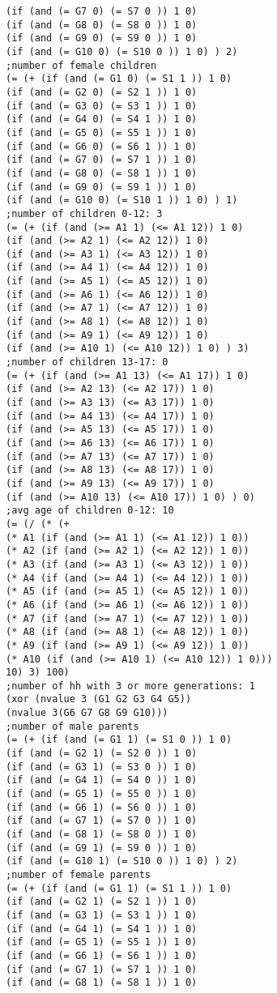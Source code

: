 \documentclass[5p,times,11pt]{elsarticle}
\begin{document}
\begin{verbatim}
(if (and (= G7 0) (= S7 0 )) 1 0)
(if (and (= G8 0) (= S8 0 )) 1 0)
(if (and (= G9 0) (= S9 0 )) 1 0)
(if (and (= G10 0) (= S10 0 )) 1 0) ) 2)
;number of female children
(= (+ (if (and (= G1 0) (= S1 1 )) 1 0)
(if (and (= G2 0) (= S2 1 )) 1 0)
(if (and (= G3 0) (= S3 1 )) 1 0)
(if (and (= G4 0) (= S4 1 )) 1 0)
(if (and (= G5 0) (= S5 1 )) 1 0)
(if (and (= G6 0) (= S6 1 )) 1 0)
(if (and (= G7 0) (= S7 1 )) 1 0)
(if (and (= G8 0) (= S8 1 )) 1 0)
(if (and (= G9 0) (= S9 1 )) 1 0)
(if (and (= G10 0) (= S10 1 )) 1 0) ) 1)
;number of children 0-12: 3
(= (+ (if (and (>= A1 1) (<= A1 12)) 1 0)
(if (and (>= A2 1) (<= A2 12)) 1 0)
(if (and (>= A3 1) (<= A3 12)) 1 0)
(if (and (>= A4 1) (<= A4 12)) 1 0)
(if (and (>= A5 1) (<= A5 12)) 1 0)
(if (and (>= A6 1) (<= A6 12)) 1 0)
(if (and (>= A7 1) (<= A7 12)) 1 0)
(if (and (>= A8 1) (<= A8 12)) 1 0)
(if (and (>= A9 1) (<= A9 12)) 1 0)
(if (and (>= A10 1) (<= A10 12)) 1 0) ) 3)
;number of children 13-17: 0
(= (+ (if (and (>= A1 13) (<= A1 17)) 1 0)
(if (and (>= A2 13) (<= A2 17)) 1 0)
(if (and (>= A3 13) (<= A3 17)) 1 0)
(if (and (>= A4 13) (<= A4 17)) 1 0)
(if (and (>= A5 13) (<= A5 17)) 1 0)
(if (and (>= A6 13) (<= A6 17)) 1 0)
(if (and (>= A7 13) (<= A7 17)) 1 0)
(if (and (>= A8 13) (<= A8 17)) 1 0)
(if (and (>= A9 13) (<= A9 17)) 1 0)
(if (and (>= A10 13) (<= A10 17)) 1 0) ) 0)
;avg age of children 0-12: 10
(= (/ (* (+
(* A1 (if (and (>= A1 1) (<= A1 12)) 1 0))
(* A2 (if (and (>= A2 1) (<= A2 12)) 1 0))
(* A3 (if (and (>= A3 1) (<= A3 12)) 1 0))
(* A4 (if (and (>= A4 1) (<= A4 12)) 1 0))
(* A5 (if (and (>= A5 1) (<= A5 12)) 1 0))
(* A6 (if (and (>= A6 1) (<= A6 12)) 1 0))
(* A7 (if (and (>= A7 1) (<= A7 12)) 1 0))
(* A8 (if (and (>= A8 1) (<= A8 12)) 1 0))
(* A9 (if (and (>= A9 1) (<= A9 12)) 1 0))
(* A10 (if (and (>= A10 1) (<= A10 12)) 1 0)))
10) 3) 100)
;number of hh with 3 or more generations: 1
(xor (nvalue 3 (G1 G2 G3 G4 G5))
(nvalue 3(G6 G7 G8 G9 G10)))
;number of male parents
(= (+ (if (and (= G1 1) (= S1 0 )) 1 0)
(if (and (= G2 1) (= S2 0 )) 1 0)
(if (and (= G3 1) (= S3 0 )) 1 0)
(if (and (= G4 1) (= S4 0 )) 1 0)
(if (and (= G5 1) (= S5 0 )) 1 0)
(if (and (= G6 1) (= S6 0 )) 1 0)
(if (and (= G7 1) (= S7 0 )) 1 0)
(if (and (= G8 1) (= S8 0 )) 1 0)
(if (and (= G9 1) (= S9 0 )) 1 0)
(if (and (= G10 1) (= S10 0 )) 1 0) ) 2)
;number of female parents
(= (+ (if (and (= G1 1) (= S1 1 )) 1 0)
(if (and (= G2 1) (= S2 1 )) 1 0)
(if (and (= G3 1) (= S3 1 )) 1 0)
(if (and (= G4 1) (= S4 1 )) 1 0)
(if (and (= G5 1) (= S5 1 )) 1 0)
(if (and (= G6 1) (= S6 1 )) 1 0)
(if (and (= G7 1) (= S7 1 )) 1 0)
(if (and (= G8 1) (= S8 1 )) 1 0)

\end{verbatim}
\end{document}
